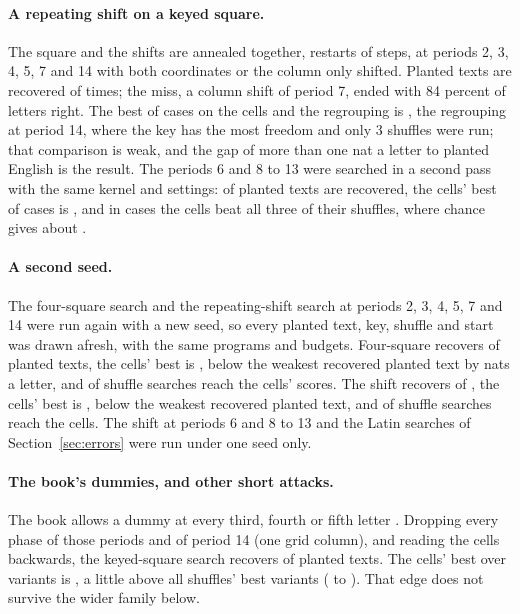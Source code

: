 \documentclass[11pt]{article}
\theoremstyle{definition}
\begin{document}
\paragraph{A repeating shift on a keyed square.} The square and the shifts are annealed together, \addRestarts{} restarts of \addSteps{} steps, at periods 2, 3, 4, 5, 7 and 14 with both coordinates or the column only shifted. Planted texts are recovered \addRecovered{} of \addPlanted{} times; the miss, a column shift of period 7, ended with 84 percent of letters right. The best of \addCases{} cases on the cells and the regrouping is \addBest{}, the regrouping at period 14, where the key has the most freedom and only 3 shuffles were run; that comparison is weak, and the gap of more than one nat a letter to planted English is the result. The periods 6 and 8 to 13 were searched in a second pass with the same kernel and settings: \sgEnRecovered{} of \sgEnPlanted{} planted texts are recovered, the cells' best of \sgEnCases{} cases is \sgEnBest{}, and in \sgEnAbove{} cases the cells beat all three of their shuffles, where chance gives about \sgEnChance{}.

\paragraph{A second seed.} The four-square search and the repeating-shift search at periods 2, 3, 4, 5, 7 and 14 were run again with a new seed, so every planted text, key, shuffle and start was drawn afresh, with the same programs and budgets. Four-square recovers \rsFsRecovered{} of \rsFsPlanted{} planted texts, the cells' best is \rsFsBest{}, below the weakest recovered planted text by \rsFsGap{} nats a letter, and \rsFsAsHigh{} of \rsFsShuffles{} shuffle searches reach the cells' scores. The shift recovers \rsAddRecovered{} of \rsAddPlanted{}, the cells' best is \rsAddBest{}, \rsAddGap{} below the weakest recovered planted text, and \rsAddAsHigh{} of \rsAddShuffles{} shuffle searches reach the cells. The shift at periods 6 and 8 to 13 and the Latin searches of Section~\ref{sec:errors} were run under one seed only.

\paragraph{The book's dummies, and other short attacks.} The book allows a dummy at every third, fourth or fifth letter \cite{wikipedia2026}. Dropping every phase of those periods and of period 14 (one grid column), and reading the cells backwards, the keyed-square search recovers \quickRecovered{} of \quickPlanted{} planted texts. The cells' best over \quickVariants{} variants is \quickBest{}, a little above all \quickShuffles{} shuffles' best variants (\quickShuffleBestLow{} to \quickShuffleBestHigh{}). That edge does not survive the wider family below.
\end{document}
